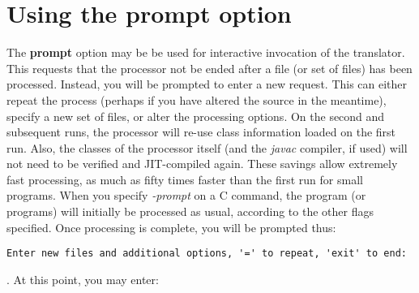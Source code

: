 \chapter{Using the prompt option}
The \textbf{prompt} option may be be used for interactive invocation of
the translator. This requests that the processor not be ended after a
file (or set of files) has been processed.  Instead, you will be
prompted to enter a new request.  This can either repeat the process
(perhaps if you have altered the source in the meantime), specify a new
set of files, or alter the processing options.
\newline
On the second and subsequent runs, the processor will re-use class
information loaded on the first run.  Also, the classes of the processor
itself (and the \emph{javac} compiler, if used) will not need to be
verified and JIT-compiled again.  These savings allow extremely fast
processing, as much as fifty times faster than the first run for small
programs.
\newline
When you specify \emph{-prompt} on a \nr{}C command, the \nr{}
program (or programs) will initially be processed as usual, according to
the other flags specified.  Once processing is complete, you will be
prompted thus:
\begin{verbatim}
Enter new files and additional options, '=' to repeat, 'exit' to end:
\end{verbatim}.
\newline
At this point, you may enter:

